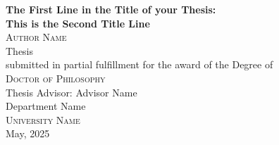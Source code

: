 \documentclass[12pt, oneside]{book}
\begin{document}


\begin{titlepage}
\begin{center}
\large{\bfseries{
    The First Line in the Title of your Thesis:\\ This is the Second Title Line\\
 }}
 \vspace{1.5cm}
 {\textsc{\Large Author Name}}\\[5pt]

\vspace{2cm}
\large{Thesis} \\[5pt]
\small{submitted in partial fulfillment for the award of the Degree
 of} \\[0.5cm]
\textsc{\Large{{Doctor of Philosophy}}} \\[5pt]
\vfill
{Thesis Advisor: Advisor Name} \vspace{0.4cm} \\[2cm]

 \vfill
\large{Department Name}\\[5pt]
\textsc{University Name}\\[0.5cm]

{May, 2025}
\end{center}
\end{titlepage}
\end{document}
